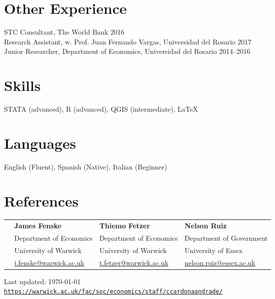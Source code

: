 \documentclass[10pt,letterpaper]{article}
\def\footerlink{https://warwick.ac.uk/fac/soc/economics/staff/ccardonaandrade/}
\renewenvironment{itemize}{
  \begin{list}{}{
    \setlength{\leftmargin}{1.5em}
  }
}{
  \end{list}
}
\begin{document}
\section*{Other Experience}

\begin{itemize}
\item STC Consultant, The World Bank \hfill 2016
   \\ Research Assistant, w. Prof. Juan Fernando Vargas, Universidad del Rosario \hfill 2017
    \\
    Junior Researcher, Department of Economics, Universidad del Rosario \hfill 2014--2016
\end{itemize}


\section*{Skills}

\begin{itemize}
 \item STATA (advanced), R (advanced), QGIS (intermediate), \LaTeX
\end{itemize}

\section*{Languages}
\begin{itemize}
 \item English (Fluent), Spanish (Native), Italian (Beginner)
\end{itemize}

\section*{References}
\noindent \begin{tabular}{l l l l}
& \textbf{James Fenske} &\textbf{Thiemo Fetzer} &\textbf{Nelson Ruiz}   \\
 &Department of Economics &  Department of Economics &Department of Government \\
 & University of Warwick &  University of Warwick & University of Essex  \\
 & \href{J.Fenske@warwick.ac.uk}{j.fenske@warwick.ac.uk} & \href{t.fetzer@warwick.ac.uk}{t.fetzer@warwick.ac.uk}  & \href{nelson.ruiz@essex.ac.uk}{nelson.ruiz@essex.ac.uk}  \\

\end{tabular}




\bigskip

\begin{center}
  \begin{footnotesize}
    Last updated: \today \\
    \href{\footerlink}{\texttt{\footerlink}}
  \end{footnotesize}
\end{center}
\end{document}
